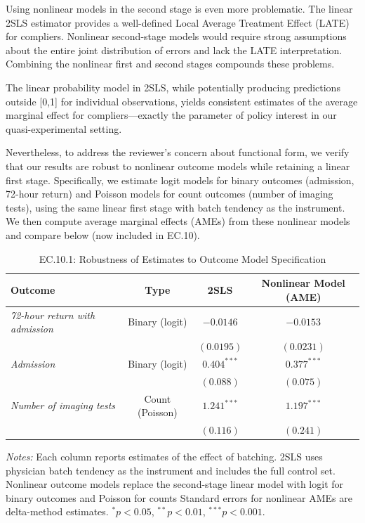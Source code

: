 \documentclass[11pt]{article}
\newcommand{\1}{\hbox{\rm 1\kern-.35em 1}}
\begin{document}
Using nonlinear models in the second stage is even more problematic. The linear 2SLS estimator provides a well-defined Local Average Treatment Effect (LATE) for compliers. Nonlinear second-stage models would require strong assumptions about the entire joint distribution of errors and lack the LATE interpretation. Combining the nonlinear first and second stages compounds these problems.

The linear probability model in 2SLS, while potentially producing predictions outside [0,1] for individual observations, yields consistent estimates of the average marginal effect for compliers—exactly the parameter of policy interest in our quasi-experimental setting.

Nevertheless, to address the reviewer's concern about functional form, we verify that our results are robust to nonlinear outcome models while retaining a linear first stage. Specifically, we estimate logit models for binary outcomes (admission, 72-hour return) and Poisson models for count outcomes (number of imaging tests), using the same linear first stage with batch tendency as the instrument. We then compute average marginal effects (AMEs) from these nonlinear models and compare below (now included in EC.10).

\begin{table}[t!]
\centering
\begin{threeparttable}
\caption*{EC.10.1: Robustness of Estimates to Outcome Model Specification}
\begin{tabular}{lccc}
\toprule
Outcome
& Type
& 2SLS
& Nonlinear Model (AME) \\
\midrule

\textit{72-hour return with admission} & Binary (logit)
& $-0.0146$ & $-0.0153$ \\
&  & {\footnotesize $(0.0195)$} & {\footnotesize $(0.0231)$} \\[0.5em]

\textit{Admission} & Binary (logit)
& $0.404^{***}$ & $0.377^{***}$ \\
&  & $(0.088)$ &  $(0.075)$ \\[0.5em]

\textit{Number of imaging tests} & Count (Poisson)
& $1.241^{***}$ & $1.197^{***}$ \\
&  & $(0.116)$ &  $(0.241)$ \\[0.5em]

\bottomrule
\end{tabular}

\begin{flushleft}
\footnotesize
\textit{Notes:}  
Each column reports estimates of the effect of batching.  
2SLS uses physician batch tendency as the instrument and includes the full control set.  
Nonlinear outcome models replace the second-stage linear model with logit for binary outcomes and Poisson for counts
Standard errors for nonlinear AMEs are delta-method estimates.  
$^{*}p<0.05$, $^{**}p<0.01$, $^{***}p<0.001$.  
\end{flushleft}

\end{threeparttable}
\end{table}
\end{document}
